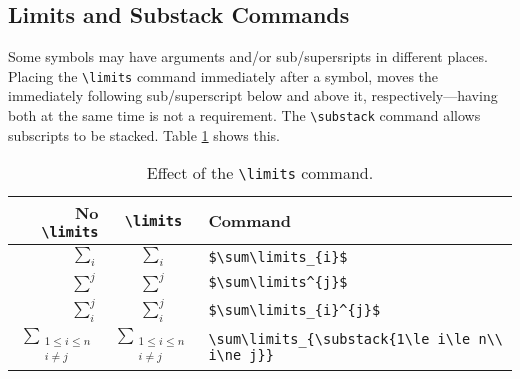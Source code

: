 \subsection{Limits and Substack Commands}
%
Some symbols may have arguments and/or sub/supersripts in different
places.  Placing the \verb|\limits| command immediately after a
symbol, moves the immediately following sub/superscript below and
above it, respectively---having both at the same time is not a
requirement.  The \verb|\substack| command allows subscripts to be
stacked.  Table \ref{t:limits} shows this.
\begin{table}[!htbp]
    \centering
    \caption{Effect of the \texttt{\textbackslash limits} command.}
    \label{t:limits}
    \begin{tabular}{rcl}
        \toprule
        No \verb|\limits| & \verb|\limits| & Command\\
        \midrule
        $\sum_{i}$ & $\sum\limits_{i}$ & \verb|$\sum\limits_{i}$| \\[0.5cm]
        $\sum^{j}$ & $\sum\limits^{j}$ & \verb|$\sum\limits^{j}$| \\[0.5cm]
        $\sum_{i}^{j}$ & $\sum\limits_{i}^{j}$ & \verb|$\sum\limits_{i}^{j}$| \\[0.5cm]
        $\sum_{\substack{1\le i\le n\\ i\ne j}}$ & $\sum\limits_{\substack{1\le i\le n\\ i\ne j}}$ & \verb|\sum\limits_{\substack{1\le i\le n\\ i\ne j}}|\\[0.1cm]
        \bottomrule
    \end{tabular}
\end{table}
%
